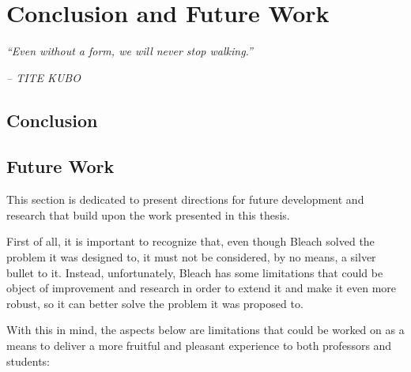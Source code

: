 \chapter{Conclusion and Future Work} \label{cap:conclusao}

\begin{displayquote}
    \begin{center}
        \textit{``Even without a form, we will never stop walking.''}
    \end{center}
\end{displayquote}

\begin{flushright}
   \textit{-- TITE KUBO}
\end{flushright}

\section{Conclusion}

\section{Future Work}
This section is dedicated to present directions for future development and research that build upon the work presented in this thesis.

First of all, it is important to recognize that, even though Bleach solved the problem it was designed to, it must not be considered, by no means, a silver bullet to it. Instead, unfortunately, Bleach has some limitations that could be object of improvement and research in order to extend it and make it even more robust, so it can better solve the problem it was proposed to.

With this in mind, the aspects below are limitations that could be worked on as a means to deliver a more fruitful and pleasant experience to both professors and students:

